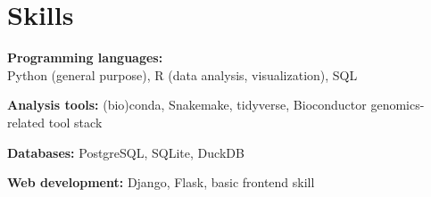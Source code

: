 \section{Skills}

\begin{entrylist}

\item \textbf{Programming languages:}\\
    Python (general purpose),
    R (data analysis, visualization),
    SQL

\item \textbf{Analysis tools:} (bio)conda, Snakemake, tidyverse, Bioconductor genomics-related tool stack

\item \textbf{Databases:} PostgreSQL, SQLite, DuckDB

\item \textbf{Web development:} Django, Flask, basic front\-end skill

\end{entrylist}
